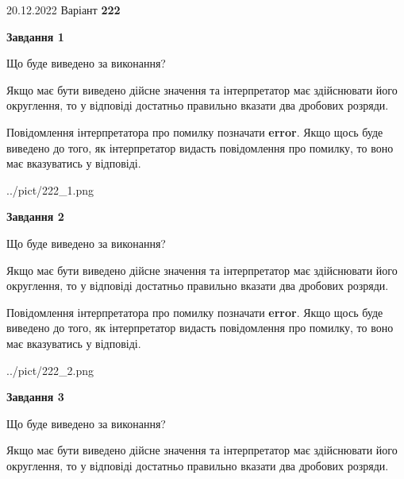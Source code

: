 \documentclass[12pt, ukrainian]{article}
\begin{document}
{20.12.2022 Варіант \No \textbf { 222 }\par}
{
\begin {Large}

{\begin {center}\textbf{Завдання 1}\end {center}}\par
Що буде виведено за виконання? \par

Якщо має бути виведено дійсне значення та інтерпретатор має здійснювати його округлення, 
то у відповіді достатньо правильно вказати два дробових розряди.

Повідомлення інтерпретатора про помилку позначати \textbf{error}.
Якщо щось буде виведено до того, як інтерпретатор видасть повідомлення про помилку, 
то воно має вказуватись у відповіді. \par

\begin{center}
	{../pict/222_1.png}
\end{center}
\newpage

{\begin {center}\textbf{Завдання 2}\end {center}}\par
Що буде виведено за виконання? \par

Якщо має бути виведено дійсне значення та інтерпретатор має здійснювати його округлення, 
то у відповіді достатньо правильно вказати два дробових розряди.

Повідомлення інтерпретатора про помилку позначати \textbf{error}.
Якщо щось буде виведено до того, як інтерпретатор видасть повідомлення про помилку, 
то воно має вказуватись у відповіді. \par

\begin{center}
	{../pict/222_2.png}
\end{center}
\newpage

{\begin {center}\textbf{Завдання 3}\end {center}}\par
Що буде виведено за виконання? \par

Якщо має бути виведено дійсне значення та інтерпретатор має здійснювати його округлення, 
то у відповіді достатньо правильно вказати два дробових розряди.


\end{Large}}
\end{document}
